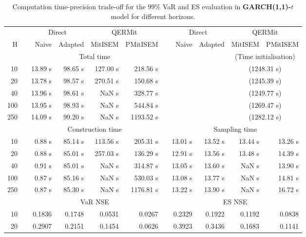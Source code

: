 \footnotesize{  
{ \renewcommand{\arraystretch}{1.3} 
\begin{longtable}{rr rrrr r rrrr}  
\caption{Computation time-precision trade-off for the  $99\%$ VaR and ES evaluation in \textbf{GARCH(1,1)-$t$} model for different horizons.} 
\label{tab:time_precision_t_garch2_noS} \\ 
 & & \multicolumn{2}{c}{Direct} & \multicolumn{2}{c}{QERMit}&  & \multicolumn{2}{c}{Direct} & \multicolumn{2}{c}{QERMit} \\ \cline{3-6} \cline{8-11} 
 H & & Naive & Adapted & MitISEM & PMitISEM & & Naive & Adapted & MitISEM & PMitISEM \\ \hline 
 & & \multicolumn{4}{c}{Total time} & & && \multicolumn{2}{c}{(Time initialisation)} \\ \cline{3-6} \cline{10-11}
10 & & 13.89 s & 98.65 s & 127.00 s & 218.56 s &&&& \multicolumn{2}{c}{(1248.31 s)} \\ 
20 & & 13.78 s & 98.57 s & 270.51 s & 150.68 s &&&& \multicolumn{2}{c}{(1245.39 s)} \\ 
40 & & 13.96 s & 98.61 s &  NaN s & 328.77 s &&&& \multicolumn{2}{c}{(1249.77 s)} \\ 
100 & & 13.95 s & 98.93 s &  NaN s & 544.84 s &&&& \multicolumn{2}{c}{(1269.47 s)} \\ 
250 & & 14.09 s & 99.20 s &  NaN s & 1193.52 s &&&& \multicolumn{2}{c}{(1282.12 s)} \\ 
\hline 
 & & \multicolumn{4}{c}{Construction time} & & \multicolumn{4}{c}{ Sampling time} \\ \cline{3-6}  \cline{8-11}
10 & & 0.88 s & 85.14 s & 113.56 s & 205.31 s && 13.01 s & 13.52 s & 13.44 s & 13.26 s \\ 
20 & & 0.88 s & 85.01 s & 257.03 s & 136.29 s && 12.91 s & 13.56 s & 13.48 s & 14.39 s \\ 
40 & & 0.91 s & 85.01 s &  NaN s & 314.87 s && 13.05 s & 13.60 s &  NaN s & 13.90 s \\ 
100 & & 0.87 s & 85.16 s &  NaN s & 530.03 s && 13.08 s & 13.77 s &  NaN s & 14.81 s \\ 
250 & & 0.87 s & 85.30 s &  NaN s & 1176.81 s && 13.22 s & 13.90 s &  NaN s & 16.72 s \\ 
\hline 
 & & \multicolumn{4}{c}{VaR NSE} &&  \multicolumn{4}{c}{ES NSE} \\ \cline{3-6}  \cline{8-11}
10 && 0.1836  & 0.1748  & 0.0531 & 0.0267 && 0.2329  & 0.1922  & 0.1192 & 0.0838 \\ 
20 && 0.2907  & 0.2151  & 0.1454 & 0.0626 && 0.3923  & 0.3436  & 0.1683 & 0.1141 \\ 

\end{longtable}}}
